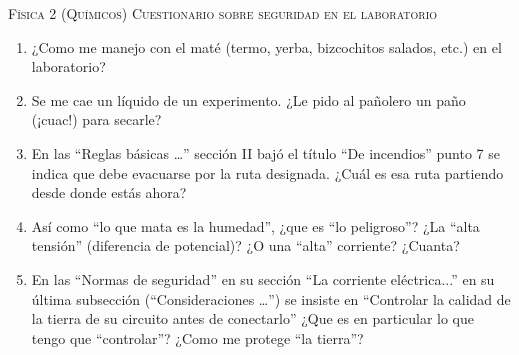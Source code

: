 \documentclass[11pt,spanish,a4paper,twoside]{article}
\begin{document}
\noindent
\textsc{\large Física 2 (Químicos)} \hfill \textsc{\large Cuestionario sobre seguridad en el laboratorio} \\



\noindent
\begin{enumerate}

\item ¿Como me manejo con el maté (termo, yerba, bizcochitos salados, etc.) en el laboratorio? %
\vspace{3.5 cm}

\item Se me cae un líquido de un experimento. ¿Le pido al pañolero un paño (¡cuac!) para secarle? %
\vspace{3.5 cm}

\item En las ``Reglas básicas \ldots'' sección II bajó el título ``De incendios'' punto 7 se indica que debe evacuarse por la ruta designada. ¿Cuál es esa ruta partiendo desde donde estás ahora?
\vspace{3.5 cm}

\item Así como ``lo que mata es la humedad'', ¿que es ``lo peligroso''? ¿La ``alta tensión'' (diferencia de potencial)? ¿O una ``alta'' corriente? ¿Cuanta? %
\vspace{3.5 cm}

\item En las ``Normas de seguridad'' en su sección ``La corriente eléctrica...'' en su última subsección (``Consideraciones \ldots'') se insiste en ``Controlar la calidad de la tierra de su circuito antes de conectarlo'' ¿Que es en particular lo que tengo que ``controlar''? ¿Como me protege ``la tierra''? %
	
\end{enumerate}
\end{document}
